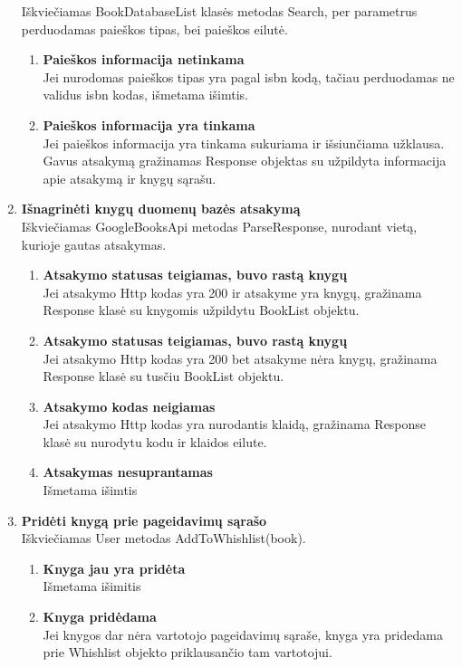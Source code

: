 \documentclass{VUMIFPSkursinis}
\begin{document}
\begin{enumerate}[label=\textbf{T\arabic*}]
				Iškviečiamas BookDatabaseList klasės metodas Search, per parametrus perduodamas paieškos tipas,
				bei paieškos eilutė.
				\begin{enumerate}[label*=\textbf{.\arabic*}]
					\item \textbf{Paieškos informacija netinkama}\\
						Jei nurodomas paieškos tipas yra pagal isbn kodą, tačiau perduodamas ne validus isbn
						kodas, išmetama išimtis.
					\item \textbf{Paieškos informacija yra tinkama}\\
						Jei paieškos informacija yra tinkama sukuriama ir išsiunčiama užklausa.
						Gavus atsakymą gražinamas Response objektas su užpildyta informacija apie atsakymą ir
						knygų sąrašu.
				\end{enumerate}
			\item \textbf{Išnagrinėti knygų duomenų bazės atsakymą}\\
				Iškviečiamas GoogleBooksApi metodas ParseResponse, nurodant vietą, kurioje gautas atsakymas.
				\begin{enumerate}[label*=\textbf{.\arabic*}]
					\item \textbf{Atsakymo statusas teigiamas, buvo rastą knygų}\\
						Jei atsakymo Http kodas yra 200 ir atsakyme yra knygų, gražinama Response klasė su knygomis užpildytu BookList objektu.
					\item \textbf{Atsakymo statusas teigiamas, buvo rastą knygų}\\
						Jei atsakymo Http kodas yra 200 bet atsakyme nėra knygų, gražinama Response klasė su tusčiu BookList objektu.
					\item \textbf{Atsakymo kodas neigiamas}\\
						Jei atsakymo Http kodas yra nurodantis klaidą, gražinama Response klasė su nurodytu kodu ir
						klaidos eilute.
					\item \textbf{Atsakymas nesuprantamas}\\
						Išmetama išimtis
				\end{enumerate}
			\item \textbf{Pridėti knygą prie pageidavimų sąrašo}\\
				Iškviečiamas User metodas AddToWhishlist(book).
				\begin{enumerate}[label*=\textbf{.\arabic*}]
					\item \textbf{Knyga jau yra pridėta}\\
						Išmetama išimitis
					\item \textbf{Knyga pridėdama}\\
						Jei knygos dar nėra vartotojo pageidavimų sąraše, knyga yra pridedama prie Whishlist objekto
						priklausančio tam vartotojui.
				\end{enumerate}
		\end{enumerate}
\end{document}
